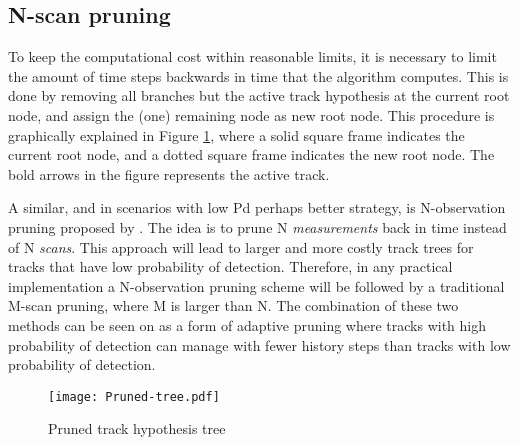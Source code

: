 \subsection{N-scan pruning}
To keep the computational cost within reasonable limits, it is necessary to limit the amount of time steps backwards in time that the algorithm computes. This is done by removing all branches but the active track hypothesis at the current root node, and assign the (one) remaining node as new root node. This procedure is graphically explained in Figure \ref{fig:pruned-hyp-tree}, where a solid square frame indicates the current root node, and a dotted square frame indicates the new root node. The bold arrows in the figure represents the active track.

A similar, and in scenarios with low \gls{Pd} perhaps better strategy, is N-\gls{observation} pruning proposed by \cite{Blackman2004}. The idea is to prune N \emph{measurements} back in time instead of N \emph{scans}. This approach will lead to larger and more costly track trees for tracks that have low probability of detection. Therefore, in any practical implementation a N-observation pruning scheme will be followed by a traditional M-scan pruning, where M is larger than N. The combination of these two methods can be seen on as a form of adaptive pruning where tracks with high probability of detection can manage with fewer history steps than tracks with low probability of detection.

\begin{figure}[ht]
\centering
\texttt{[image: Pruned-tree.pdf]}
\caption{Pruned track hypothesis tree}
\label{fig:pruned-hyp-tree}
\end{figure}